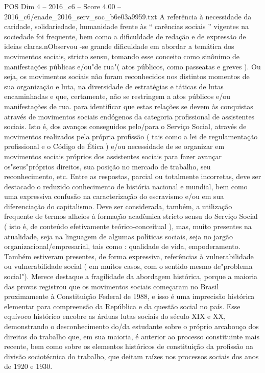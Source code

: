 \begin{textsample}{POS Dim 4 – 2016\_c6 – Score 4.00 – 2016\_c6/enade\_2016\_serv\_soc\_b6e03a9959.txt}
A referência à necessidade da caridade, solidariedade, humanidade frente às “ carências sociais ” vigentes na sociedade foi frequente, bem como a dificuldade de redação e de expressão de ideias claras.nObservou -se grande dificuldade em abordar a temática dos movimentos sociais, stricto sensu, tomando esse conceito como sinônimo de manifestações públicas e/ou"de rua"( atos públicos, como passeatas e greves ).
Ou seja, os movimentos sociais não foram reconhecidos nos distintos momentos de sua organização e luta, na diversidade de estratégias e táticas de lutas encaminhadas e que, certamente, não se restringem a atos públicos e/ou manifestações de rua. para identificar que estas relações se devem às conquistas através de movimentos sociais endógenos da categoria profissional de assistentes sociais.
Isto é, dos avanços conseguidos pelo/para o Serviço Social, através de movimentos realizados pela própria profissão ( tais como a lei de regulamentação profissional e o Código de Ética ) e/ou necessidade de se organizar em movimentos sociais próprios dos assistentes sociais para fazer avançar os"seus"próprios direitos, sua posição no mercado de trabalho, seu reconhecimento, etc.
Entre as respostas, parcial ou totalmente incorretas, deve ser destacado o reduzido conhecimento de história nacional e mundial, bem como uma expressiva confusão na caracterização do escravismo e/ou em sua diferenciação do capitalismo.
Deve ser considerada, também, a utilização frequente de termos alheios à formação acadêmica stricto sensu do Serviço Social ( isto é, de conteúdo efetivamente teórico-conceitual ), mas, muito presentes na atualidade, seja na linguagem de algumas políticas sociais, seja no jargão organizacional/empresarial, tais como : qualidade de vida, empoderamento.
Também estiveram presentes, de forma expressiva, referências à vulnerabilidade ou vulnerabilidade social ( em muitos casos, com o sentido mesmo de"problema social").
Merece destaque a fragilidade da abordagem histórica, porque a maioria das provas registrou que os movimentos sociais começaram no Brasil proximamente à Constituição Federal de 1988, e isso é uma imprecisão histórica elementar para compreensão da República e da questão social no país.
Esse equívoco histórico encobre as árduas lutas sociais do século XIX e XX, demonstrando o desconhecimento do/da estudante sobre o próprio arcabouço dos direitos do trabalho que, em sua maioria, é anterior ao processo constituinte mais recente, bem como sobre os elementos históricos de constituição da profissão na divisão sociotécnica do trabalho, que deitam raízes nos processos sociais dos anos de 1920 e 1930.

\end{textsample}
